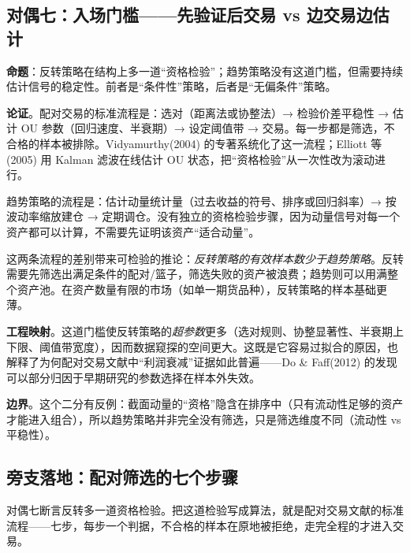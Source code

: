 \subsection{对偶七：入场门槛——先验证后交易 vs 边交易边估计}

\textbf{命题}：反转策略在结构上多一道“资格检验”；趋势策略没有这道门槛，但需要持续估计信号的稳定性。前者是“条件性”策略，后者是“无偏条件”策略。

\textbf{论证}。配对交易的标准流程是：选对（距离法或协整法）→ 检验价差平稳性 → 估计 OU 参数（回归速度、半衰期）→ 设定阈值带 → 交易。每一步都是筛选，不合格的样本被排除。Vidyamurthy(2004) 的专著系统化了这一流程\cite{vidyamurthy2004}；Elliott 等(2005) 用 Kalman 滤波在线估计 OU 状态，把“资格检验”从一次性改为滚动进行\cite{elliott2005}。

趋势策略的流程是：估计动量统计量（过去收益的符号、排序或回归斜率）→ 按波动率缩放建仓 → 定期调仓。没有独立的资格检验步骤，因为动量信号对每一个资产都可以计算，不需要先证明该资产“适合动量”。

这两条流程的差别带来可检验的推论：\emph{反转策略的有效样本数少于趋势策略}。反转需要先筛选出满足条件的配对/篮子，筛选失败的资产被浪费；趋势则可以用满整个资产池。在资产数量有限的市场（如单一期货品种），反转策略的样本基础更薄。

\textbf{工程映射}。这道门槛使反转策略的\emph{超参数}更多（选对规则、协整显著性、半衰期上下限、阈值带宽度），因而数据窥探的空间更大。这既是它容易过拟合的原因，也解释了为何配对交易文献中“利润衰减”证据如此普遍——Do \& Faff(2012) 的发现可以部分归因于早期研究的参数选择在样本外失效\cite{dofaff2012}。

\textbf{边界}。这个二分有反例：截面动量的“资格”隐含在排序中（只有流动性足够的资产才能进入组合），所以趋势策略并非完全没有筛选，只是筛选维度不同（流动性 vs 平稳性）。

\subsection{旁支落地：配对筛选的七个步骤}

对偶七断言反转多一道资格检验。把这道检验写成算法，就是配对交易文献的标准流程\cite{vidyamurthy2004}——七步，每步一个判据，不合格的样本在原地被拒绝，走完全程的才进入交易。

